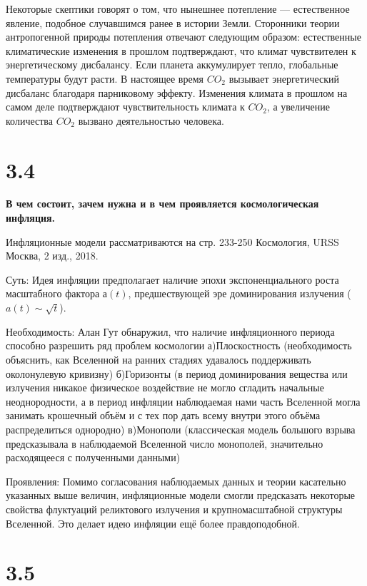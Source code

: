 \documentclass[a4paper,14pt]{article}
\begin{document}
Некоторые скептики говорят о том, что нынешнее потепление --- естественное явление, подобное случавшимся ранее в истории Земли. Сторонники теории антропогенной природы потепления отвечают следующим образом: естественные климатические изменения в прошлом подтверждают, что климат чувствителен к энергетическому дисбалансу. Если планета аккумулирует тепло, глобальные температуры будут расти. В настоящее время $CO_{2}$ вызывает энергетический дисбаланс благодаря парниковому эффекту. Изменения климата в прошлом на самом деле подтверждают чувствительность климата к $CO_{2}$, а увеличение количества $CO_{2}$ вызвано деятельностью человека.
\newline

\section*{3.4}

\begin{center}
	\LARGE{\textbf{В чем состоит, зачем нужна и в чем проявляется космологическая инфляция.}}\\
\end{center}

Инфляционные модели рассматриваются на стр. 233-250 Космология, URSS Москва, 2 изд., 2018.

Суть:
Идея инфляции предполагает наличие эпохи экспоненциального роста масштабного фактора $а(t)$, предшествующей эре доминирования излучения ($a(t)\sim\sqrt{t}$).

Необходимость:
Алан Гут обнаружил, что наличие инфляционного периода способно разрешить ряд проблем космологии
а)Плоскостность (необходимость объяснить, как Вселенной на ранних стадиях удавалось поддерживать околонулевую кривизну)
б)Горизонты (в период доминирования вещества или излучения никакое физическое воздействие не могло сгладить начальные неоднородности, а в период инфляции наблюдаемая нами часть Вселенной могла занимать крошечный объём и с тех пор дать всему внутри этого объёма распределиться однородно)
в)Монополи (классическая модель большого взрыва предсказывала в наблюдаемой Вселенной число монополей, значительно расходящееся с полученными данными)

Проявления:
Помимо согласования наблюдаемых данных и теории касательно указанных выше величин, инфляционные модели смогли предсказать некоторые свойства флуктуаций реликтового излучения и крупномасштабной структуры Вселенной.
Это делает идею инфляции ещё более правдоподобной.

\section*{3.5}
\end{document}
